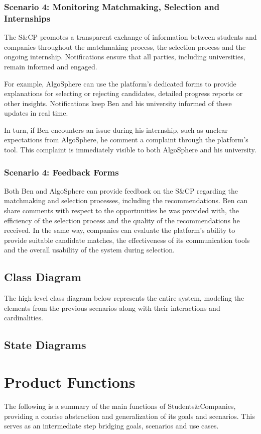 \subsubsection{Scenario 4: Monitoring Matchmaking, Selection and Internships}
The S\&CP promotes a transparent exchange of information between students and companies throughout the matchmaking process, the selection process and the ongoing internship.
Notifications ensure that all parties, including universities, remain informed and engaged.

For example, AlgoSphere can use the platform's dedicated forms to provide explanations for selecting or rejecting candidates, detailed progress reports or other insights.
Notifications keep Ben and his university informed of these updates in real time.

In turn, if Ben encounters an issue during his internship, such as unclear expectations from AlgoSphere, he comment a complaint through the platform's tool.
This complaint is immediately visible to both AlgoSphere and his university.

\subsubsection{Scenario 4: Feedback Forms}
Both Ben and AlgoSphere can provide feedback on the S\&CP regarding the matchmaking and selection processes, including the recommendations.
Ben can share comments with respect to the opportunities he was provided with, the efficiency of the selection process and the quality of the recommendations he received.
In the same way, companies can evaluate the platform's ability to provide suitable candidate matches, the effectiveness of its communication tools and the overall usability of the system during selection.

\subsection{Class Diagram}
The high-level class diagram below represents the entire system, modeling the elements from the previous scenarios along with their interactions and cardinalities.

\subsection{State Diagrams}
\section{Product Functions}
The following is a summary of the main functions of Students\&Companies, providing a concise abstraction and generalization of its goals and scenarios.
This serves as an intermediate step bridging goals, scenarios and use cases.


